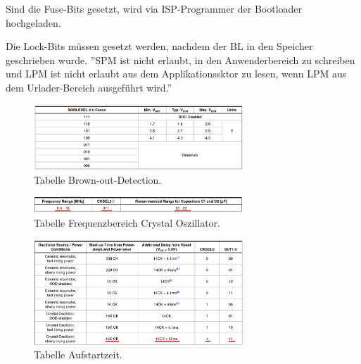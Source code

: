 Sind die Fuse-Bits gesetzt, wird via ISP-Programmer der Bootloader hochgeladen.

Die Lock-Bits müssen gesetzt werden, nachdem der BL in den Speicher geschrieben wurde. ''SPM ist nicht erlaubt, in den Anwenderbereich zu schreiben und LPM ist nicht erlaubt aus dem Applikationssktor zu lesen, wenn LPM aus dem Urlader-Bereich ausgeführt wird.''\cite{haftmann_programmierung_nodate}

\begin{figure}[H]
	\centering
	\includegraphics[width=0.7\textwidth]{graphics/Tabelle_BoD}
	\caption{Tabelle Brown-out-Detection.\cite[S.361]{atmel_atmel_2014}}
	\label{fig:Tabelle_BoD}
\end{figure}


\begin{figure}[H]
	\centering
	\includegraphics[width=0.7\textwidth]{graphics/Tabelle_Crystal}
	\caption{Tabelle Frequenzbereich Crystal Oszillator.\cite[S.43]{atmel_atmel_2014}}
	\label{fig:Tabelle_Crystal}
\end{figure}

\begin{figure}[H]
	\centering
	\includegraphics[width=0.7\textwidth]{graphics/Tabelle_Crystal2}
	\caption{Tabelle Aufstartzeit.\cite[S.43]{atmel_atmel_2014}}
	\label{fig:Tabelle_Crystal2}
\end{figure}

